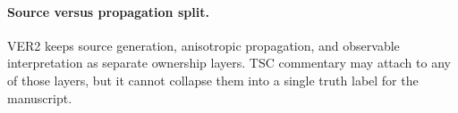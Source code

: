 \paragraph{Source versus propagation split.}
VER2 keeps source generation, anisotropic propagation, and observable
interpretation as separate ownership layers. TSC commentary may attach to any
of those layers, but it cannot collapse them into a single truth label for
the manuscript.
